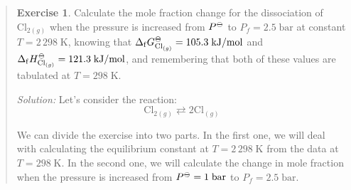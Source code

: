 \documentclass[
  9pt,
]{extbook}
\theoremstyle{definition}
\theoremstyle{definition}
\theoremstyle{definition}
\newtheorem{exercise}{Exercise}[chapter]
\theoremstyle{remark}
\begin{document}
\begin{quote}
\begin{exercise}
\protect\hypertarget{exr:kpkx}{}{\label{exr:kpkx} }Calculate the mole fraction change for the dissociation of \(\mathrm{Cl}_{2(g)}\) when the pressure is increased from \(P^{-\kern-6pt{\ominus}\kern-6pt-}\) to \(P_f=2.5 \;\text{bar}\) at constant \(T=2\,298\;\mathrm{K}\), knowing that \(\Delta_{\mathrm{f}} G^{-\kern-6pt{\ominus}\kern-6pt-}_{\mathrm{Cl}_{(g)}} = 105.3 \;\text{kJ/mol}\) and \(\Delta_{\mathrm{f}} H^{-\kern-6pt{\ominus}\kern-6pt-}_{\mathrm{Cl}_{(g)}} = 121.3 \;\text{kJ/mol}\), and remembering that both of these values are tabulated at \(T=298\;\text{K}\).

\emph{Solution:} Let's consider the reaction:
\[
\mathrm{Cl}_{2(g)} \rightleftarrows 2 \mathrm{Cl}_{(g)}
\]

We can divide the exercise into two parts. In the first one, we will deal with calculating the equilibrium constant at \(T=2\,298\;\mathrm{K}\) from the data at \(T=298\;\mathrm{K}\). In the second one, we will calculate the change in mole fraction when the pressure is increased from \(P^{-\kern-6pt{\ominus}\kern-6pt-}=1\;\text{bar}\) to \(P_f=2.5 \;\text{bar}\).


\end{exercise}
\end{quote}
\end{document}
